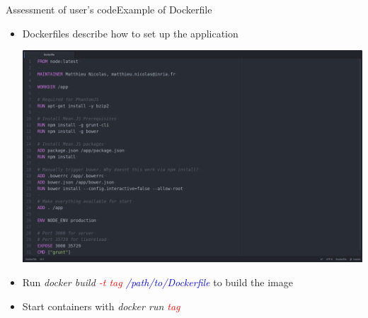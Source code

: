 \documentclass{beamer}
\begin{document}
\begin{frame}{Assessment of user's code}{Example of Dockerfile}
  \begin{itemize}
  \item {
    Dockerfiles describe how to set up the application
  }
  \begin{center}
    \includegraphics[scale=0.12]{img/dockerfile.png}
  \end{center}
  \item {
    Run \emph{docker build \textcolor{red}{-t tag} \textcolor{blue}{/path/to/Dockerfile}} to build  the image
  }
  \item {
    Start containers with \emph{docker run \textcolor{red}{tag}}
  }
  \end{itemize}
\end{frame}

{ %
  \begin{frame}[plain]
  \end{frame}
}
\end{document}
